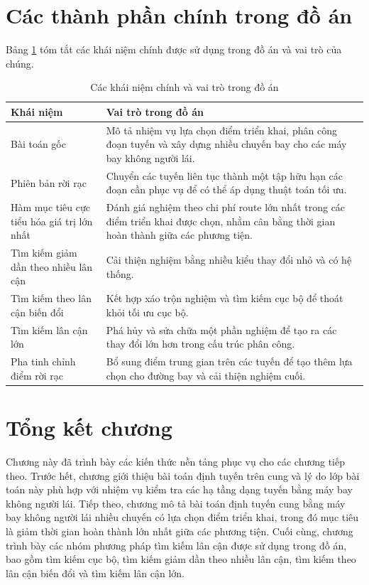 \section{Các thành phần chính trong đồ án}

Bảng \ref{tab:chapter2-components-natural} tóm tắt các khái niệm chính được sử dụng trong đồ án và vai trò của chúng.

\begin{table}[H]
\centering
\caption{Các khái niệm chính và vai trò trong đồ án}
\label{tab:chapter2-components-natural}
\begin{tabular}{|p{4.0cm}|p{9.0cm}|}
\hline
\textbf{Khái niệm} & \textbf{Vai trò trong đồ án} \\
\hline
Bài toán gốc & Mô tả nhiệm vụ lựa chọn điểm triển khai, phân công đoạn tuyến và xây dựng nhiều chuyến bay cho các máy bay không người lái. \\
\hline
Phiên bản rời rạc & Chuyển các tuyến liên tục thành một tập hữu hạn các đoạn cần phục vụ để có thể áp dụng thuật toán tối ưu. \\
\hline
Hàm mục tiêu cực tiểu hóa giá trị lớn nhất & Đánh giá nghiệm theo chi phí route lớn nhất trong các điểm triển khai được chọn, nhằm cân bằng thời gian hoàn thành giữa các phương tiện. \\
\hline
Tìm kiếm giảm dần theo nhiều lân cận & Cải thiện nghiệm bằng nhiều kiểu thay đổi nhỏ và có hệ thống. \\
\hline
Tìm kiếm theo lân cận biến đổi & Kết hợp xáo trộn nghiệm và tìm kiếm cục bộ để thoát khỏi tối ưu cục bộ. \\
\hline
Tìm kiếm lân cận lớn & Phá hủy và sửa chữa một phần nghiệm để tạo ra các thay đổi lớn hơn trong cấu trúc phân công. \\
\hline
Pha tinh chỉnh điểm rời rạc & Bổ sung điểm trung gian trên các tuyến để tạo thêm lựa chọn cho đường bay và cải thiện nghiệm cuối. \\
\hline
\end{tabular}
\end{table}

\section{Tổng kết chương}

Chương này đã trình bày các kiến thức nền tảng phục vụ cho các chương tiếp theo. Trước hết, chương giới thiệu bài toán định tuyến trên cung và lý do lớp bài toán này phù hợp với nhiệm vụ kiểm tra các hạ tầng dạng tuyến bằng máy bay không người lái. Tiếp theo, chương mô tả bài toán định tuyến cung bằng máy bay không người lái nhiều chuyến có lựa chọn điểm triển khai, trong đó mục tiêu là giảm thời gian hoàn thành lớn nhất giữa các phương tiện. Cuối cùng, chương trình bày các nhóm phương pháp tìm kiếm lân cận được sử dụng trong đồ án, bao gồm tìm kiếm cục bộ, tìm kiếm giảm dần theo nhiều lân cận, tìm kiếm theo lân cận biến đổi và tìm kiếm lân cận lớn.
